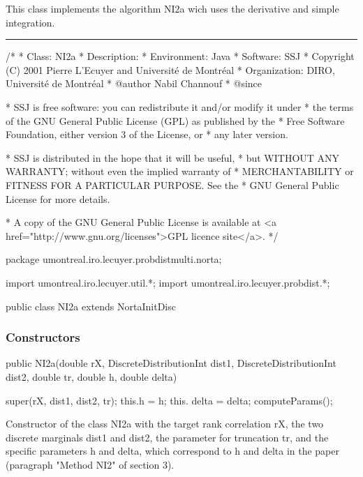 This class implements the algorithm NI2a wich uses the derivative and
  simple integration.
\bigskip\hrule

\begin{code}
\begin{hide}
/*
 * Class:        NI2a
 * Description:
 * Environment:  Java
 * Software:     SSJ
 * Copyright (C) 2001  Pierre L'Ecuyer and Université de Montréal
 * Organization: DIRO, Université de Montréal
 * @author       Nabil Channouf
 * @since

 * SSJ is free software: you can redistribute it and/or modify it under
 * the terms of the GNU General Public License (GPL) as published by the
 * Free Software Foundation, either version 3 of the License, or
 * any later version.

 * SSJ is distributed in the hope that it will be useful,
 * but WITHOUT ANY WARRANTY; without even the implied warranty of
 * MERCHANTABILITY or FITNESS FOR A PARTICULAR PURPOSE.  See the
 * GNU General Public License for more details.

 * A copy of the GNU General Public License is available at
   <a href="http://www.gnu.org/licenses">GPL licence site</a>.
 */
\end{hide}
package umontreal.iro.lecuyer.probdistmulti.norta;
\begin{hide}
import umontreal.iro.lecuyer.util.*;
import umontreal.iro.lecuyer.probdist.*;
\end{hide}

public class NI2a extends NortaInitDisc \begin{hide}
{
   private double h; /* Predefined step size for the integration-grid
   			 spacing (also named h in the paper, paragraph
   			 "Method NI2" of section 3). */
   private double delta; /* Small positive parameter to make sure that
   			      rho_m is not too close to 1 or -1;
   			      (also named delta in the paper, paragraph "
   			      Method NI2" of section 3). */
\end{hide}
\end{code}
\subsubsection* {Constructors}

\begin{code}

   public NI2a(double rX, DiscreteDistributionInt dist1,
               DiscreteDistributionInt dist2, double tr, double h,
               double delta)\begin{hide}
   {
      super(rX, dist1, dist2, tr);
      this.h = h;
      this. delta = delta;
      computeParams();
   }\end{hide}
\end{code}
\begin{tabb}
  Constructor of the class NI2a with the target rank correlation rX,
       the two discrete marginals dist1 and dist2,
       the parameter for truncation tr, and the specific
       parameters h and delta, which correspond to h and delta in the paper
       (paragraph "Method NI2" of section 3).
\end{tabb}

